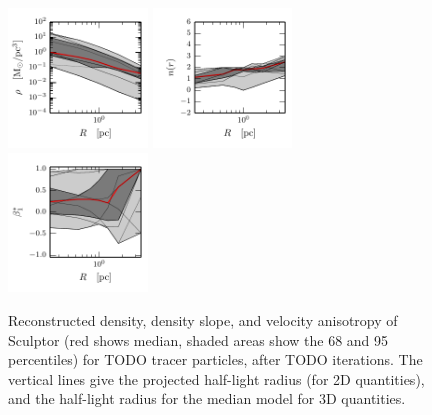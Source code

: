 \begin{figure}
    \begin{center}
        \includegraphics[width=0.33\textwidth]{fig/sculptor/prof_rho_0}
        \includegraphics[width=0.33\textwidth]{fig/sculptor/prof_nr_0}
        \includegraphics[width=0.33\textwidth]{fig/sculptor/prof_betastar_1}
        \caption{Reconstructed density, density slope, and velocity
          anisotropy of Sculptor (red shows median, shaded areas
          show the 68 and 95 percentiles) for TODO tracer particles, after
          TODO iterations. The vertical lines give the projected
          half-light radius (for 2D quantities), and the half-light
          radius for the median model for 3D quantities.}
        \label{fig:fornax}
    \end{center}
\end{figure}

